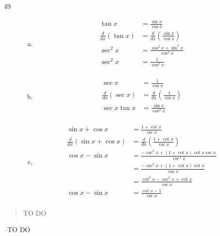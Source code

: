 \documentclass[letterpaper, landscape]{exam}
\begin{document}
\begin{description}
    \item[49]
      \begin{enumerate}[(a)]
        \item 
          \begin{align*}
            \tan x                  & = \frac{\sin x}{\cos x} \\
            \frac{d}{dx} ( \tan x ) & = \frac{d}{dx} \left( \frac{\sin x}{\cos x} \right) \\
            \sec^2 x                & =  \frac{\cos^2 x + \sin^2 x}{\cos^2 x} \\
            \sec^2 x                & =  \frac{1}{\cos^2 x} \\
          \end{align*}

        \item
          \begin{align*}
            \sec x                  & = \frac{1}{\cos x} \\
            \frac{d}{dx} ( \sec x ) & = \frac{d}{dx} \left( \frac{1}{\cos x} \right) \\
            \sec x \tan x           & = \frac{\sin x}{\cos^2 x} \\
          \end{align*}

        \item
          \begin{align*}
            \sin x + \cos x                  & = \frac{1 + \cot x }{\csc x} \\
            \frac{d}{dx} ( \sin x + \cos x ) & = \frac{d}{dx} \left( \frac{1 + \cot x }{\csc x}  \right) \\
            \cos x - \sin x                  & = \frac{ - \csc^3 x + (1 + \cot x) \cot x \csc x }{\csc^2 x} \\
                                             & = \frac{ - \csc^2 x + (1 + \cot x) \cot x }{\csc x} \\
                                             & = \frac{ \cot^2 x - \csc^2 x + \cot x }{\csc x} \\
            \cos x - \sin x                  & = \frac{ \cot x - 1 }{\csc x} \\
          \end{align*}
      \end{enumerate}

  \end{description}

  \else
    \vspace{10 cm}
    \begin{quote}
      \begin{em}
        TO DO
      \end{em}
    \end{quote}
    \hspace{2 cm} --TO DO
  \fi
\end{document}
